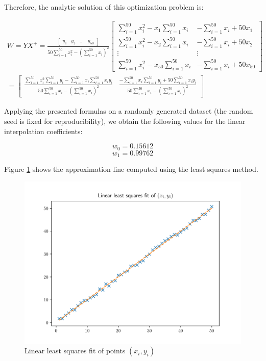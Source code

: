 \documentclass[letterpaper,headings=standardclasses]{scrartcl}
\begin{document}
Therefore, the analytic solution of this optimization problem is:

\begin{multline*}
W = YX^{+} = \frac{\left[ \begin{matrix} y_1 & y_2 & \dots & y_{50} \end{matrix} \right]}{50 \sum_{i = 1}^{50} x_i^2 - \left( \sum_{i = 1}^{50} x_i \right)^2} \left[ \begin{matrix} \sum_{i = 1}^{50} x_i^2 - x_1 \sum_{i = 1}^{50} x_i & -\sum_{i = 1}^{50} x_i + 50 x_1 \\[0.5em] \sum_{i = 1}^{50} x_i^2 - x_2 \sum_{i = 1}^{50} x_i & -\sum_{i = 1}^{50} x_i + 50 x_2 \\[0.5em] \vdots & \vdots \\[0.5em] \sum_{i = 1}^{50} x_i^2 - x_{50} \sum_{i = 1}^{50} x_i & -\sum_{i = 1}^{50} x_i + 50 x_{50} \end{matrix} \right] \\
= \left[ \begin{matrix} \frac{\textstyle \sum_{i = 1}^{50} x_i^2 \sum_{i = 1}^{50} y_i - \sum_{i = 1}^{50} x_i \sum_{i = 1}^{50} x_i y_i}{\textstyle 50 \sum_{i = 1}^{50} x_i - \left( \sum_{i = 1}^{50} x_i \right)^2} & \frac{\textstyle -\sum_{i = 1}^{50} x_i \sum_{i = 1}^{50} y_i + 50 \sum_{i = 1}^{50} x_i y_i}{\textstyle 50 \sum_{i = 1}^{50} x_i - \left( \sum_{i = 1}^{50} x_i \right)^2} \end{matrix} \right]
\end{multline*}

Applying the presented formulas on a randomly generated dataset (the random seed is fixed for reproducibility), we obtain the following values for the linear interpolation coefficients:

$$ w_0 = 0.15612 $$
$$ w_1 = 0.99762 $$

Figure \ref{lls} shows the approximation line computed using the least squares method.

\begin{figure}[h]
\centering
\includegraphics[width=.7\linewidth]{lls.pdf}
\caption{Linear least squares fit of points $(x_i, y_i)$}
\label{lls}
\end{figure}
\end{document}

